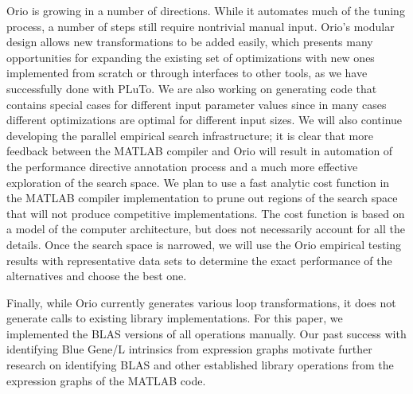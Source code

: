 \documentclass[runningheads]{llncs}
\begin{document}
Orio is growing in a number of directions. While it automates much of the tuning process, a number of steps still require nontrivial manual input. Orio's modular design allows new transformations to be added easily, which presents many opportunities for expanding the existing set of optimizations with new ones implemented from scratch or through interfaces to other tools, as we have successfully done with PLuTo. We are also working on generating code that contains special cases for different input parameter values since in many cases different optimizations are optimal for different input sizes.  We will also continue developing the parallel empirical search infrastructure; it is clear that more feedback between the MATLAB compiler and Orio will result in automation of the performance directive annotation process and a much more effective exploration of the search space. We plan to use a fast analytic cost function in the MATLAB compiler implementation to prune out regions of the search space that will not produce competitive implementations. The cost function is based on a model of the computer architecture, but does not necessarily account for all the details. Once the search space is narrowed, we will use the Orio empirical testing results with representative data sets to determine the exact performance of the alternatives and choose the best one.

Finally, while Orio currently generates various loop transformations, it does not generate calls to existing library implementations. For this paper, we implemented the BLAS versions of all operations manually. Our past success with identifying Blue Gene/L intrinsics from expression graphs motivate further research on identifying BLAS and other established library operations from the expression graphs of the MATLAB code.
\cite{Siek}




\end{document}
